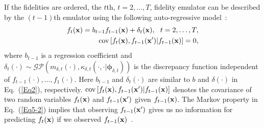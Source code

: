 \documentclass[iicol,sn-basic]{sn-jnl}%
\theoremstyle{thmstyleone}%
\theoremstyle{thmstyletwo}
\theoremstyle{thmstylethree}
\begin{document}
\begin{linenumbers}
If the fidelities are ordered, the $t$th, $t=2,\dots,T$, fidelity emulator can be described by the $(t-1)$th emulator using the following auto-regressive model~\citep{Kennedy2000}:
\begin{subequations}\label{Eq5}
	\begin{align}
		f_t({\bf x}) =
		b_{t-1} f_{t-1}({\bf x}) + \delta_{t}({\bf x}), \ \  t=2,\dots,T \label{Eq5-1},\\
		\text{cov}\left[f_{t}({\bf x}),f_{t-1}({\bf x}')|f_{t-1}({\bf x})\right]=0 
		\label{Eq5-2},
	\end{align}
\end{subequations}
where $b_{t-1}$ is a regression coefficient and $\delta_{t}(\cdot) \sim \mathcal{GP}\left(m_{\delta,t}(\cdot),\kappa_{\delta,t}(\cdot,\cdot|{\boldsymbol \phi}_{\delta,t})\right)$ is the discrepancy function independent of $f_{t-1}(\cdot),\dots,f_{1}(\cdot)$.
Here $b_{t-1}$ and $\delta_{t}(\cdot)$ are similar to $b$ and $\delta(\cdot)$ in Eq.~(\ref{Eq2}), respectively.
$\text{cov}\left[f_{t}({\bf x}),f_{t-1}({\bf x}')|f_{t-1}({\bf x})\right]$ denotes the covariance of two random variables $f_{t}({\bf x})$ and $f_{t-1}({\bf x}')$ given $f_{t-1}({\bf x})$. 
The Markov property in Eq.~(\ref{Eq5-2}) implies that observing $f_{t-1}({\bf x}')$ gives us no information for predicting $f_{t}({\bf x})$ if we observed $f_{t-1}({\bf x})$~\citep{Kennedy2000}.
 

\end{linenumbers}
\end{document}
